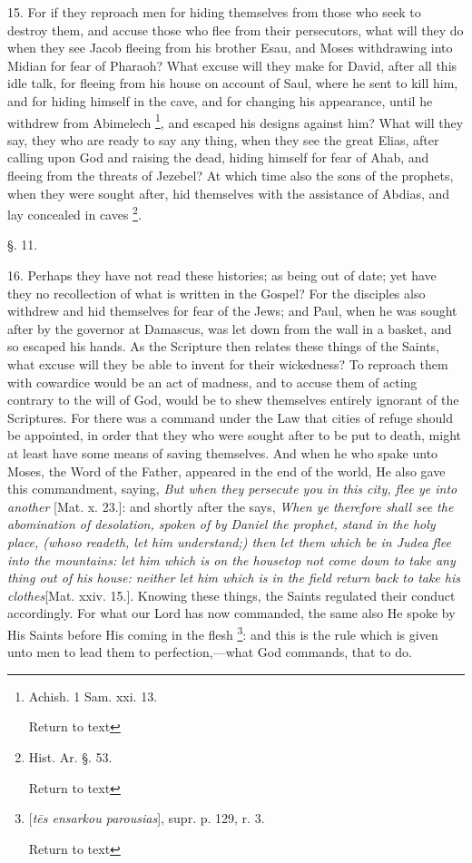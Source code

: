 15. For if they reproach men for hiding
themselves from those who seek to destroy them, and accuse those who
flee from their persecutors, what will they do when they see Jacob
fleeing from his brother Esau, and Moses withdrawing into Midian for
fear of Pharaoh? What excuse will they make for David, after all this
idle talk, for fleeing from his house on account of Saul, where he
sent to kill him, and for hiding himself in the cave, and for changing
his appearance, until he withdrew from Abimelech \footnote{Achish. 1 Sam. xxi. 13.

Return to text}, and escaped his designs against him? What will they
say, they who are ready to say any thing, when they see the great
Elias, after calling upon God and raising the dead, hiding himself for
fear of Ahab, and fleeing from the threats of Jezebel? At which time
also the sons of the prophets, when they were sought after, hid
themselves with the assistance of Abdias, and lay concealed in caves \footnote{Hist. Ar. §. 53.

Return to text}.

§. 11.

16. Perhaps they have not read these histories;
as being out of date; yet have they no recollection of what is written
in the Gospel? For the disciples also withdrew and hid themselves for
fear of the Jews; and Paul, when he was sought after by the governor
at Damascus, was let down from the wall in a basket, and so escaped
his hands. As the Scripture then relates these things of the Saints,
what excuse will they be able to invent for their wickedness? To
reproach them with cowardice would be an act of madness, and to accuse
them of acting contrary to the will of God, would be to shew
themselves entirely ignorant of the Scriptures. For there was a
command under the Law that cities of refuge should be appointed, in
order that they who were sought after to be put to death, might at
least have some means of saving themselves. And when he who spake unto
Moses, the Word of the Father, appeared in the end of the world, He
also gave this commandment, saying, \emph{But when they persecute you in
this city, flee ye into another} [Mat. x. 23.]: and shortly after
the says, \emph{When ye therefore shall see the abomination of
desolation, spoken of by Daniel the prophet, stand in the holy place,
(whoso readeth, let him understand;) then let them which be in Judea
flee into the mountains: let him which is on the housetop not come
down to take any thing out of his house: neither let him which is in
the field return back to take his clothes}[Mat. xxiv. 15.].
Knowing these things, the Saints regulated their conduct accordingly.
For what our Lord has now commanded, the same also He spoke by His
Saints before His coming in the flesh \footnote{[\emph{t\={e}s ensarkou parousias}], supr. p. 129, r. 3.

Return to text}: and this is the rule which is given unto men to lead them to
perfection,—what God commands, that to do.

